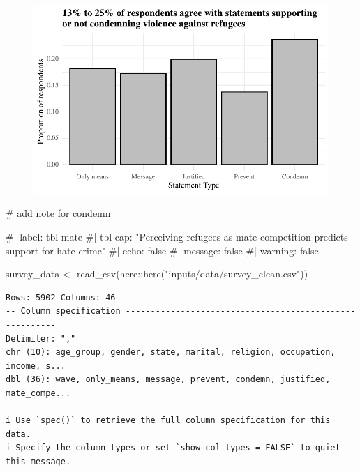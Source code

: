 \documentclass[
]{article}
\newenvironment{Shaded}{\begin{snugshade}}{\end{snugshade}}
\newcommand{\CommentTok}[1]{\textcolor[rgb]{0.37,0.37,0.37}{#1}}
\newcommand{\FunctionTok}[1]{\textcolor[rgb]{0.28,0.35,0.67}{#1}}
\newcommand{\NormalTok}[1]{\textcolor[rgb]{0.00,0.23,0.31}{#1}}
\newcommand{\OtherTok}[1]{\textcolor[rgb]{0.00,0.23,0.31}{#1}}
\newcommand{\SpecialCharTok}[1]{\textcolor[rgb]{0.37,0.37,0.37}{#1}}
\newcommand{\StringTok}[1]{\textcolor[rgb]{0.13,0.47,0.30}{#1}}
\begin{document}
\begin{figure}[H]

{\centering \includegraphics{paper_files/figure-pdf/unnamed-chunk-4-1.pdf}

}

\end{figure}

\begin{Shaded}
\begin{Highlighting}[]
\CommentTok{\# add note for condemn}
\end{Highlighting}
\end{Shaded}

\renewcommand{\arraystretch}{1.5}

\begin{Shaded}
\begin{Highlighting}[]
\CommentTok{\#| label: tbl{-}mate}
\CommentTok{\#| tbl{-}cap: "Perceiving refugees as mate competition predicts support for hate crime"}
\CommentTok{\#| echo: false}
\CommentTok{\#| message: false}
\CommentTok{\#| warning: false}

\NormalTok{survey\_data }\OtherTok{\textless{}{-}} \FunctionTok{read\_csv}\NormalTok{(here}\SpecialCharTok{::}\FunctionTok{here}\NormalTok{(}\StringTok{"inputs/data/survey\_clean.csv"}\NormalTok{))}
\end{Highlighting}
\end{Shaded}

\begin{verbatim}
Rows: 5902 Columns: 46
-- Column specification --------------------------------------------------------
Delimiter: ","
chr (10): age_group, gender, state, marital, religion, occupation, income, s...
dbl (36): wave, only_means, message, prevent, condemn, justified, mate_compe...

i Use `spec()` to retrieve the full column specification for this data.
i Specify the column types or set `show_col_types = FALSE` to quiet this message.
\end{verbatim}
\end{document}
